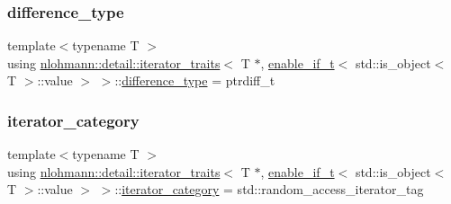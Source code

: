 \subsubsection{\texorpdfstring{difference\+\_\+type}{difference\_type}}
{\footnotesize\ttfamily template$<$typename T $>$ \\
using \hyperlink{structnlohmann_1_1detail_1_1iterator__traits}{nlohmann\+::detail\+::iterator\+\_\+traits}$<$ T $\ast$, \hyperlink{namespacenlohmann_1_1detail_a02bcbc878bee413f25b985ada771aa9c}{enable\+\_\+if\+\_\+t}$<$ std\+::is\+\_\+object$<$ T $>$\+::value $>$ $>$\+::\hyperlink{structnlohmann_1_1detail_1_1iterator__traits_3_01_t_01_5_00_01enable__if__t_3_01std_1_1is__objec8d960665487688165530972cda4f1bea_ae7be99eb434f5b5f34692874c272b759}{difference\+\_\+type} =  ptrdiff\+\_\+t}

\mbox{\label{structnlohmann_1_1detail_1_1iterator__traits_3_01_t_01_5_00_01enable__if__t_3_01std_1_1is__objec8d960665487688165530972cda4f1bea_a9b043cfe0fdfb3e9665428fb2be9cea1}} 
\subsubsection{\texorpdfstring{iterator\+\_\+category}{iterator\_category}}
{\footnotesize\ttfamily template$<$typename T $>$ \\
using \hyperlink{structnlohmann_1_1detail_1_1iterator__traits}{nlohmann\+::detail\+::iterator\+\_\+traits}$<$ T $\ast$, \hyperlink{namespacenlohmann_1_1detail_a02bcbc878bee413f25b985ada771aa9c}{enable\+\_\+if\+\_\+t}$<$ std\+::is\+\_\+object$<$ T $>$\+::value $>$ $>$\+::\hyperlink{structnlohmann_1_1detail_1_1iterator__traits_3_01_t_01_5_00_01enable__if__t_3_01std_1_1is__objec8d960665487688165530972cda4f1bea_a9b043cfe0fdfb3e9665428fb2be9cea1}{iterator\+\_\+category} =  std\+::random\+\_\+access\+\_\+iterator\+\_\+tag}

